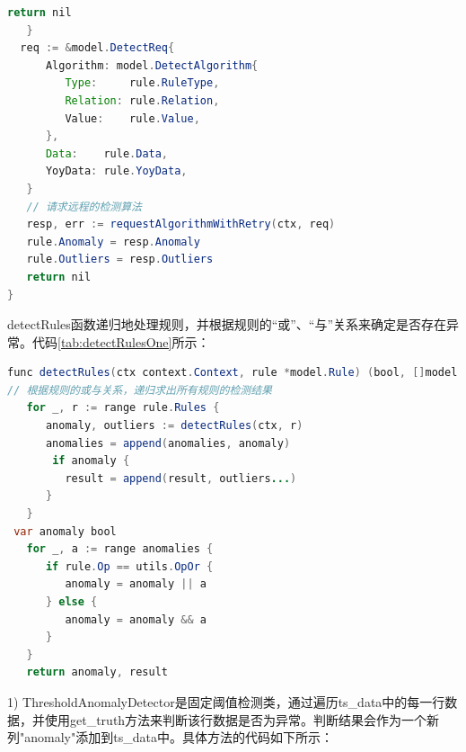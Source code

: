 \begin{longtable}[htbp]
\begin{lrbox}{\getRuleErrorTwo}  
\begin{lstlisting}[language=Java]
       return nil
   }
  req := &model.DetectReq{
      Algorithm: model.DetectAlgorithm{
         Type:     rule.RuleType,
         Relation: rule.Relation,
         Value:    rule.Value,
      },
      Data:    rule.Data,
      YoyData: rule.YoyData,
   }
   // 请求远程的检测算法
   resp, err := requestAlgorithmWithRetry(ctx, req)
   rule.Anomaly = resp.Anomaly
   rule.Outliers = resp.Outliers
   return nil
}
\end{lstlisting}  
\end{lrbox} 
\begin{table}[h]   
\usebox{\getRuleErrorTwo}  
\end{table} 
 


\newpage
detectRules函数递归地处理规则，并根据规则的“或”、“与”关系来确定是否存在异常。代码\ref{tab:detectRulesOne}所示：


\begin{lrbox}{\detectRulesOne}  
\begin{lstlisting}[language=Java]  
func detectRules(ctx context.Context, rule *model.Rule) (bool, []model.RuleOutliers) {
// 根据规则的或与关系，递归求出所有规则的检测结果
   for _, r := range rule.Rules {
      anomaly, outliers := detectRules(ctx, r)
      anomalies = append(anomalies, anomaly)
       if anomaly {
         result = append(result, outliers...)
      }
   }
 var anomaly bool
   for _, a := range anomalies {
      if rule.Op == utils.OpOr {
         anomaly = anomaly || a
      } else {
         anomaly = anomaly && a
      }
   }
   return anomaly, result
\end{lstlisting}  
\end{lrbox}   
\begin{table}[h]   
\caption{检测规则detectRules函数}  
\label{tab:detectRulesOne}  
\usebox{\detectRulesOne}  
\end{table} 

  

1)	ThresholdAnomalyDetector是固定阈值检测类，通过遍历ts\_data中的每一行数据，并使用get\_truth方法来判断该行数据是否为异常。判断结果会作为一个新列"anomaly"添加到ts\_data中。具体方法的代码如下所示：


\end{longtable}
